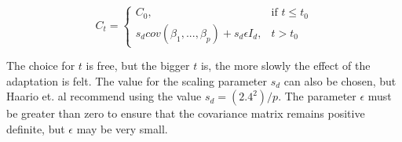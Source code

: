 \[
    C_t = 
\begin{cases}
    C_0 ,& \text{if } t\leq t_0\\
    s_d cov(\beta_1,...,\beta_{p}) + s_d \epsilon I_d,              & t > t_0
\end{cases}
\]

The choice for $t$ is free, but the bigger $t$ is, the more slowly the effect of the adaptation is felt. The value for the scaling parameter $s_d$ can also be chosen, but Haario et. al recommend using the value $s_d = (2.4^2)/p$. The parameter $\epsilon$ must be greater than zero to ensure that the covariance matrix remains positive definite, but $\epsilon$ may be very small. 




